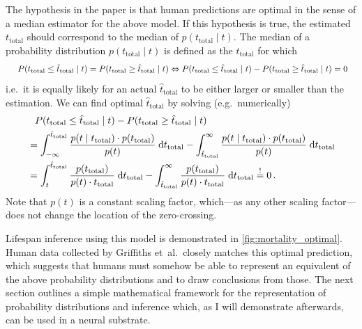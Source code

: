 \documentclass[a4paper,11pt]{article}
\begin{document}
The hypothesis in the paper is that human predictions are optimal in the sense of a median estimator for the above model. If this hypothesis is true, the estimated $t_\mathrm{total}$ should correspond to the median of $p(t_\mathrm{total} \mid t)$. The median of a probability distribution $p(t_\mathrm{total} \mid t)$ is defined as the $t_\mathrm{total}$ for which
\begin{align}
	&\hphantom{=}
	   \;\; P(t_\mathrm{total} \leq \hat t_\mathrm{total} \mid t)
	 =  P(t_\mathrm{total} \geq \hat t_\mathrm{total} \mid t) \Leftrightarrow P(t_\mathrm{total} \leq \hat t_\mathrm{total} \mid t) - P(t_\mathrm{total} \geq \hat t_\mathrm{total} \mid t) = 0
	\label{eqn:median}
\end{align}
i.e.~it is equally likely for an actual $\hat t_\mathrm{total}$ to be either larger or smaller than the estimation. We can find optimal $\hat t_\mathrm{total}$ by solving (e.g.~numerically)
\begin{align}
	\begin{aligned}
	&\hphantom{=} P(t_\mathrm{total} \leq \hat t_\mathrm{total} \mid t) - P(t_\mathrm{total} \geq \hat t_\mathrm{total} \mid t) \\
	&=
		\int_{-\infty}^{\hat t_\mathrm{total}} \frac{p(t \mid t_\mathrm{total}) \cdot p(t_\mathrm{total})}{p(t)} \; \mathrm{d} t_\mathrm{total}
		-
		\int_{\hat t_\mathrm{total}}^{\infty} \frac{p(t \mid t_\mathrm{total}) \cdot p(t_\mathrm{total})}{p(t)} \; \mathrm{d} t_\mathrm{total}
		\\
	&=
		\int_{t}^{\hat t_\mathrm{total}} \frac{p(t_\mathrm{total})}{p(t) \cdot t_\mathrm{total}} \; \mathrm{d} t_\mathrm{total}
		-
		\int_{\hat t_\mathrm{total}}^{\infty} \frac{p(t_\mathrm{total})}{p(t) \cdot t_\mathrm{total}} \; \mathrm{d} t_\mathrm{total}
	\overset{!}= 0
	\,.
	\end{aligned}
	\label{eqn:optimal_inference}
\end{align}
Note that $p(t)$ is a constant scaling factor, which---as any other scaling factor---does not change the location of the zero-crossing.

Lifespan inference using this model is demonstrated in \cref{fig:mortality_optimal}. Human data collected by Griffiths et~al.~closely matches this optimal prediction, which suggests that humans must somehow be able to represent an equivalent of the above probability distributions and to draw conclusions from those. The next section outlines a simple mathematical framework for the representation of probability distributions and inference which, as I will demonstrate afterwards, can be used in a neural substrate.
\end{document}
